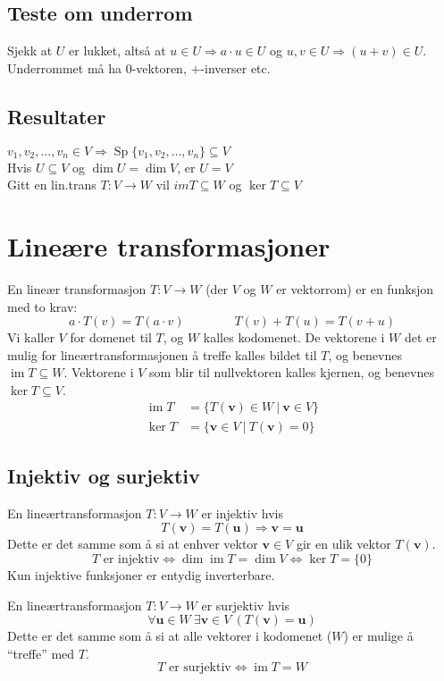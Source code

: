 \documentclass[12pt,a4paper,norsk]{article}
\DeclareMathOperator{\Sp}{Sp} %
\DeclareMathOperator{\image}{im} %
\newcommand{\vv}{\textbf{v}}
\newcommand{\vu}{\textbf{u}}
\begin{document}
\subsection{Teste om underrom}
Sjekk at $U$ er lukket, altså at $u \in U \Longrightarrow a \cdot u \in U$ og
$u, v \in U \Longrightarrow (u+v) \in U$. \\
Underrommet må ha $0$-vektoren, $+$-inverser etc.

\subsection{Resultater}
$v_{1}, v_{2}, \ldots, v_{n} \in V \Longrightarrow \Sp\{v_{1}, v_{2}, \ldots, v_{n}\} \subseteq V$\\
Hvis $U \subseteq V$ og $\dim U = \dim V$, er $U = V$ \\
Gitt en lin.trans $T:V\rightarrow W$ vil $im T \subseteq W$ og $\ker T \subseteq V$

\section{Lineære transformasjoner}
En lineær transformasjon $T:V \rightarrow W$ (der $V$ og $W$ er vektorrom) er en funksjon
med to krav:
\[a \cdot T(v) = T(a\cdot v) \hspace{4em} T(v) + T(u) = T(v+u)\]
Vi kaller $V$ for domenet til $T$, og $W$ kalles kodomenet. De vektorene i $W$
det er mulig for lineærtransformasjonen å treffe kalles bildet til $T$, og
benevnes $\image T \subseteq W$. Vektorene i $V$ som blir til nullvektoren kalles
kjernen, og benevnes $\ker T \subseteq V$.
\begin{align*}
  \image T &= \{T(\vv) \in W\ |\ \vv \in V\} \\
  \ker T &= \{\vv \in V\ |\ T(\vv) = 0\}
\end{align*}

\subsection{Injektiv og surjektiv}
En lineærtransformasjon $T:V \rightarrow W$ er injektiv hvis
\[T(\vv) = T(\vu) \Rightarrow \vv = \vu\]
Dette er det samme som å si at enhver vektor $\vv \in V$ gir en ulik vektor
$T(\vv)$.
\[T \text{ er injektiv} \iff \dim \image T = \dim V \iff \ker T = \{0\}\]
Kun injektive funksjoner er entydig inverterbare.

En lineærtransformasjon $T:V \rightarrow W$ er surjektiv hvis
\[\forall \vu \in W\ \exists\vv \in V\ (T(\vv) = \vu)\]
Dette er det samme som å si at alle vektorer i kodomenet ($W$) er mulige å ``treffe''
med $T$.
\[T \text{ er surjektiv} \iff \image T = W\]
\end{document}
